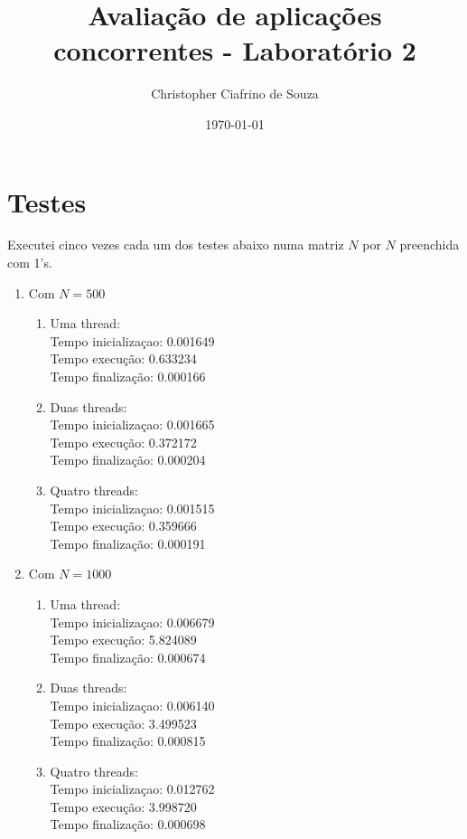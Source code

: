\documentclass[11pt,oneside,openright,numbers=noenddot]{scrbook}
\author{Christopher Ciafrino de Souza}
\title{Avaliação de aplicações concorrentes - Laboratório 2}
\date{\today}
\begin{document}
\maketitle

\section{Testes}
Executei cinco vezes cada um dos testes abaixo 
numa matriz $N$ por $N$ preenchida com 1's. 

\begin{enumerate}
	\item Com $N = 500$
	\begin{enumerate}
		\item Uma thread:\\
			Tempo inicializaçao: 0.001649\\
			Tempo execução: 0.633234\\
			Tempo finalização: 0.000166
		\item Duas threads:\\
			Tempo inicializaçao: 0.001665\\
			Tempo execução: 0.372172\\
			Tempo finalização: 0.000204		
		\item Quatro threads:\\
			Tempo inicializaçao: 0.001515\\
			Tempo execução: 0.359666\\
			Tempo finalização: 0.000191
	\end{enumerate}
	\item Com $N = 1000$
	\begin{enumerate}
		\item Uma thread:\\
			Tempo inicializaçao: 0.006679\\
			Tempo execução: 5.824089\\
			Tempo finalização: 0.000674	
		\item Duas threads:\\
			Tempo inicializaçao: 0.006140\\
			Tempo execução: 3.499523\\
			Tempo finalização: 0.000815
		\item Quatro threads:\\
			Tempo inicializaçao: 0.012762\\
			Tempo execução: 3.998720\\
			Tempo finalização: 0.000698
	\end{enumerate}


\end{enumerate}
\end{document}
